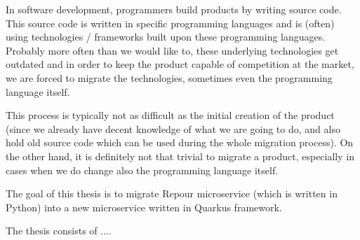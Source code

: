 \documentclass[../../main.tex]{subfiles}
\begin{document}
In software development, programmers build products by writing source code. This source code is written in specific programming languages and is (often) using technologies / frameworks built upon these programming languages. Probably more often than we would like to, these underlying technologies get outdated and in order to keep the product capable of competition at the market, we are forced to migrate the technologies, sometimes even the programming language itself.

This process is typically not as difficult as the initial creation of the product (since we already have decent knowledge of what we are going to do, and also hold old source code which can be used during the whole migration process). On the other hand, it is definitely not that trivial to migrate a product, especially in cases when we do change also the programming language itself.

The goal of this thesis is to migrate Repour microservice (which is written in Python) into a new microservice written in Quarkus framework.

The thesis consists of .... %
\end{document}
